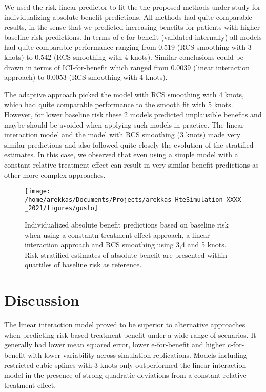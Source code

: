 \documentclass{article}
\begin{document}
We used the risk linear predictor to fit the the proposed methods under
study for individualizing absolute benefit predictions. All methods had
quite comparable results, in the sense that we predicted increasing
benefits for patients with higher baseline risk predictions. In terms of
c-for-benefit (validated internally) all models had quite comparable
performance ranging from 0.519 (RCS smoothing with 3 knots) to 0.542
(RCS smoothing with 4 knots). Similar conclusions could be drawn in
terms of ICI-for-benefit which ranged from 0.0039 (linear interaction
approach) to 0.0053 (RCS smoothing with 4 knots).

The adaptive approach picked the model with RCS smoothing with 4 knots,
which had quite comparable performance to the smooth fit with 5 knots.
However, for lower baseline risk these 2 models predicted implausible
benefits and maybe should be avoided when applying such models in
practice. The linear interaction model and the model with RCS smoothing
(3 knots) made very similar predictions and also followed quite closely
the evolution of the stratified estimates. In this case, we observed
that even using a simple model with a constant relative treatment effect
can result in very similar benefit predictions as other more complex
approaches.

\begin{figure}
\texttt{[image: /home/arekkas/Documents/Projects/arekkas\_HteSimulation\_XXXX\_2021/figures/gusto]} \caption{Individualized absolute benefit predictions based on baseline risk when using a constantn treatment effect approach, a linear interaction approach and RCS smoothing using 3,4 and 5 knots. Risk stratified estimates of absolute benefit are presented within quartiles of baseline risk as reference.}\label{fig:gusto}
\end{figure}

\hypertarget{discussion}{%
\section{Discussion}\label{discussion}}

The linear interaction model proved to be superior to alternative
approaches when predicting risk-based treatment benefit under a wide
range of scenarios. It generally had lower mean squared error, lower
e-for-benefit and higher c-for-benefit with lower variability across
simulation replications. Models including restricted cubic splines with
3 knots only outperformed the linear interaction model in the presence
of strong quadratic deviations from a constant relative treatment
effect.
\end{document}
